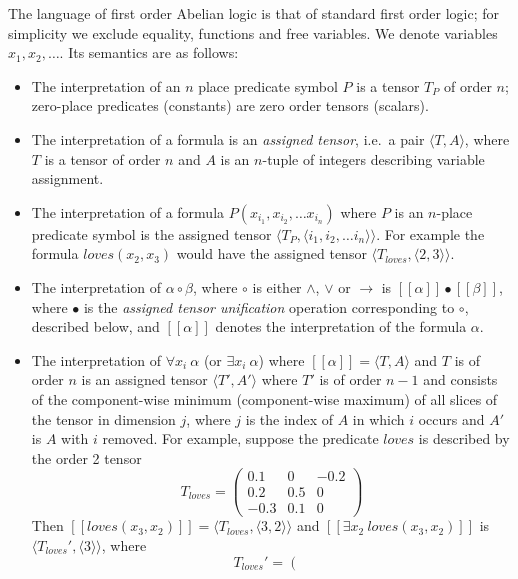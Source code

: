 \documentclass{article}
\newcommand{\interp}[1]{[\![ #1 ]\!]}
\begin{document}
The language of first order Abelian logic is that of standard first
order logic; for simplicity we exclude equality, functions and free
variables. We denote variables $x_1, x_2, \ldots$. Its
semantics are as follows:
\begin{itemize}
\item The interpretation of an $n$ place predicate symbol $P$ is a
  tensor $T_P$ of order $n$; zero-place predicates (constants) are
  zero order tensors (scalars).
\item The interpretation of a formula is an \emph{assigned tensor},
  i.e.~a pair $\langle T, A\rangle$, where $T$ is a tensor of order
  $n$ and $A$ is an $n$-tuple of integers describing variable
  assignment.
\item The interpretation of a formula $P(x_{i_1}, x_{i_2},\ldots
  x_{i_n})$ where $P$ is an $n$-place predicate symbol is the assigned
  tensor $\langle T_P, \langle i_1, i_2, \ldots i_n\rangle\rangle$. For
  example the formula $\mathit{loves}(x_2, x_3)$ would have the
  assigned tensor $\langle T_{\mathit{loves}}, \langle 2, 3
  \rangle\rangle$.
\item The interpretation of $\alpha \circ \beta$, where $\circ$ is
  either $\land$, $\lor$ or $\rightarrow$ is
  $\interp{\alpha}\bullet\interp{\beta}$, where $\bullet$ is the
  \emph{assigned tensor unification} operation corresponding to
  $\circ$, described below, and $\interp{\alpha}$ denotes the
  interpretation of the formula $\alpha$.
\item The interpretation of $\forall x_i\ \alpha$ (or $\exists
  x_i\ \alpha$) where $\interp{\alpha} = \langle T, A\rangle$ and $T$
  is of order $n$ is an assigned tensor $\langle T', A'\rangle$ where
  $T'$ is of order $n-1$ and consists of the component-wise minimum
  (component-wise maximum) of all slices of the tensor in dimension
  $j$, where $j$ is the index of $A$ in which $i$ occurs and $A'$ is
  $A$ with $i$ removed. For example, suppose the predicate
  $\mathit{loves}$ is described by the order 2 tensor
$$T_{\mathit{loves}} = \left( \begin{array}{rrr}
0.1 & 0 & -0.2 \\
0.2 & 0.5 & 0 \\
-0.3 & 0.1 & 0 \end{array} \right)$$
Then $\interp{\mathit{loves}(x_3, x_2)} = \langle{T_{\mathit{loves}},
  \langle 3,2\rangle\rangle}$ and $\interp{\exists
  x_2\ \mathit{loves}(x_3, x_2)}$ is $\langle T_{\mathit{loves}}',
\langle 3\rangle\rangle$, where
$$T_{\mathit{loves}}' = \left( \begin{array}{r}

\end{array}$$
\end{itemize}
\end{document}
